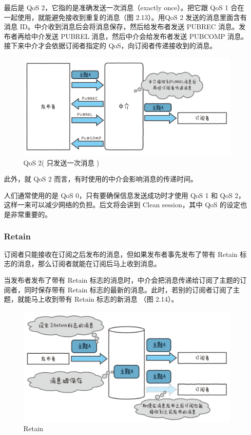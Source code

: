 \documentclass[12pt,UTF8]{ctexbook}
\begin{document}
最后是 QoS 2，它指的是准确发送一次消息（exactly once）。把它跟 QoS 1 合在一起使用，就能避免接收到重复的消息（图 2.13）。用QoS 2 发送的消息里面含有消息 ID。中介收到消息后会将消息保存，然后给发布者发送 PUBREC 消息。发布者再给中介发送 PUBREL 消息，然后中介会给发布者发送 PUBCOMP 消息。接下来中介才会依据订阅者指定的 QoS，向订阅者传递接收到的消息。

\begin{figure}[htbp]
	\centering
	\includegraphics[width=1\linewidth]{32}
	\caption{QoS 2( 只发送一次消息 )}
	\label{fig:1}
\end{figure}

此外，就 QoS 2 而言，有时使用的中介会影响消息的传递时间。

人们通常使用的是 QoS 0，只有要确保信息发送成功时才使用 QoS 1 和 QoS 2，这样一来可以减少网络的负担。后文将会讲到 Clean session，其中 QoS 的设定也是非常重要的。

\subsubsection{Retain}

订阅者只能接收在订阅之后发布的消息，但如果发布者事先发布了带有 Retain 标志的消息，那么订阅者就能在订阅后马上收到消息。

当发布者发布了带有 Retain 标志的消息时，中介会把消息传递给订阅了主题的订阅者，同时保存带有 Retain 标志的最新的消息。此时，若别的订阅者订阅了主题，就能马上收到带有 Retain 标志的新消息
（图 2.14）。

\begin{figure}[htbp]
	\centering
	\includegraphics[width=1\linewidth]{33}
	\caption{Retain}
	\label{fig:1}
\end{figure}
\end{document}
